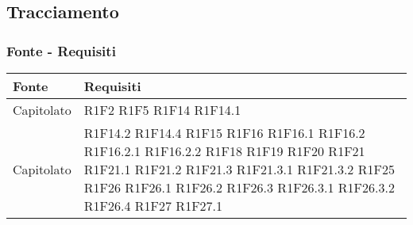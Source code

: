 \subsection{Tracciamento}
\subsubsection{Fonte - Requisiti}
\begin{center}
	\begin{longtable}{|p{44mm}|p{22mm}|}
		\hline
		\rowcolor{lighter-grayer}
		\textbf{Fonte} &  \textbf{Requisiti}  \\
		\hline
		\endhead
		
		
Capitolato &
R1F2 \newline
R1F5 \newline
R1F14 \newline
R1F14.1
\\
\hline
Capitolato &R1F14.2 \newline
R1F14.4 \newline
R1F15 \newline
R1F16 \newline
R1F16.1 \newline
R1F16.2 \newline
R1F16.2.1 \newline
R1F16.2.2 \newline
R1F18 \newline
R1F19 \newline
R1F20 \newline
R1F21 \newline
R1F21.1 \newline
R1F21.2 \newline
R1F21.3 \newline
R1F21.3.1 \newline
R1F21.3.2 \newline
R1F25 \newline
R1F26 \newline
R1F26.1 \newline
R1F26.2 \newline
R1F26.3 \newline
R1F26.3.1 \newline
R1F26.3.2 \newline
R1F26.4 \newline
R1F27 \newline
R1F27.1 \newline

\end{longtable}
\end{center}
